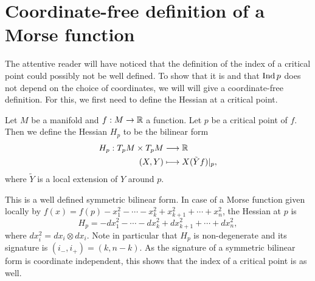 
\section{Coordinate-free definition of a Morse function}


The attentive reader will have noticed that the definition of the index of a critical point could possibly not be well defined.
To show that it is and that $\operatorname{Ind} p$ does not depend on the choice of coordinates, we will will give a coordinate-free definition. For this, we first need to define the Hessian at a critical point.

\begin{definition}
    Let $M$ be a manifold and $f: M \to  \mathbb{R}$ a function.
    Let $p$ be a critical point of $f$.
    Then we define the Hessian $H_p$ to be the bilinear form
    \begin{align*}
        H_p: T_pM \times T_pM &\longrightarrow  \mathbb{R}\\
        (X, Y) &\longmapsto X (\tilde{Y} f)|_p
    ,\end{align*} 
    where $\tilde{Y}$ is a local extension of $Y$ around $p$.
\end{definition}
This is a well defined symmetric bilinear form.
In case of a Morse function given locally by $f(x) = f(p) - x_1^2 - \cdots - x_k^2 + x_{k+1}^2 + \cdots + x_n^2$, the Hessian at $p$ is 
\[
    H_p = - dx_1^2 - \cdots - dx_k^2 + dx_{k+1}^2  + \cdots + dx_n^2
,\] 
where $dx_i^2 = dx_i \otimes dx_i$.
Note in particular that $H_p$ is non-degenerate and its signature is $(i_-, i_{+}) = (k, n-k)$.
As the signature of a symmetric bilinear form is coordinate independent, this shows that the index of a critical point is as well.


